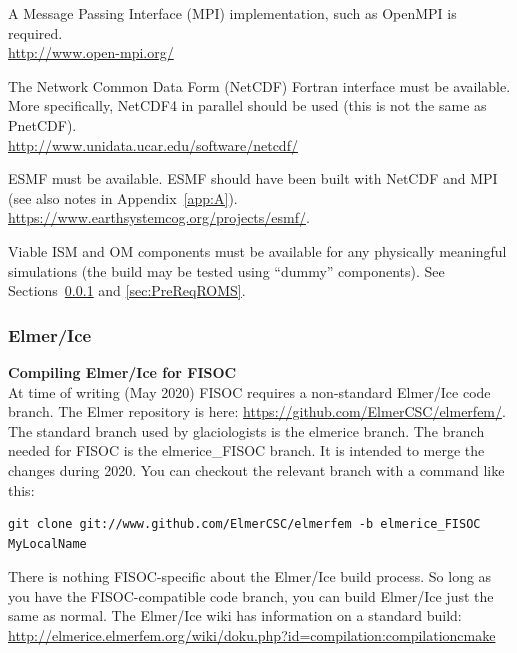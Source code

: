 \documentclass[11pt]{article}
\begin{document}
A Message Passing Interface (MPI) implementation, such as 
OpenMPI is required.\\
 \url{http://www.open-mpi.org/}

The Network Common Data Form (NetCDF) Fortran interface must be available. 
More specifically, NetCDF4 in parallel should be used (this is not the same as PnetCDF). \\
\url{http://www.unidata.ucar.edu/software/netcdf/}

ESMF must be available. ESMF should have been built with NetCDF and MPI 
(see also notes in Appendix~\ref{app:A}). \\
\url{https://www.earthsystemcog.org/projects/esmf/}.


Viable ISM and OM components must be available for any physically meaningful simulations
(the build may be tested using ``dummy'' components).  
See Sections~\ref{sec:PreReqElmer} and \ref{sec:PreReqROMS}.


\subsubsection{Elmer/Ice}
\label{sec:PreReqElmer}

\textbf{Compiling Elmer/Ice for FISOC} \\
At time of writing (May 2020) FISOC requires a non-standard Elmer/Ice 
code branch.
The Elmer repository is here:
\url{https://github.com/ElmerCSC/elmerfem/}.
The standard branch used by glaciologists is the elmerice branch. 
The branch needed for FISOC is the elmerice\_FISOC branch. 
It is intended to merge the changes during 2020.
You can checkout the relevant branch with a command like this:
\begin{lstlisting}
git clone git://www.github.com/ElmerCSC/elmerfem -b elmerice_FISOC MyLocalName
\end{lstlisting}

There is nothing FISOC-specific about the Elmer/Ice build process.  
So long as you have the FISOC-compatible code branch, you can build Elmer/Ice 
just the same as normal. 
The Elmer/Ice wiki has information on a standard build:
\url{http://elmerice.elmerfem.org/wiki/doku.php?id=compilation:compilationcmake}
\end{document}
